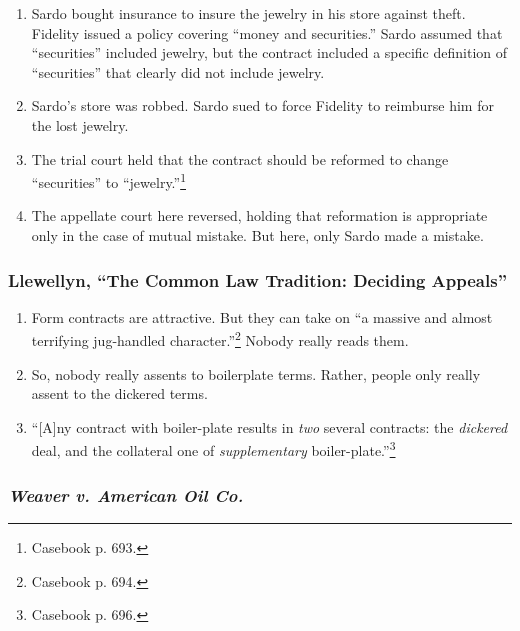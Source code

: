 \begin{enumerate}
    \item Sardo bought insurance to insure the jewelry in his store against 
    theft. Fidelity issued a policy covering ``money and securities.'' Sardo 
    assumed that ``securities'' included jewelry, but the contract included a 
    specific definition of ``securities'' that clearly did not include 
    jewelry.
    \item Sardo's store was robbed. Sardo sued to force Fidelity to reimburse 
    him for the lost jewelry.
    \item The trial court held that the contract should be reformed to change 
    ``securities'' to ``jewelry.''\footnote{Casebook p. 693.}
    \item The appellate court here reversed, holding that reformation is 
    appropriate only in the case of mutual mistake. But here, only Sardo made 
    a mistake. 
\end{enumerate}

\subsubsection{Llewellyn, ``The Common Law Tradition: Deciding Appeals''}

\begin{enumerate}
    \item Form contracts are attractive. But they can take on ``a massive and 
    almost terrifying jug-handled character.''\footnote{Casebook p. 694.} 
    Nobody really reads them.
    \item So, nobody really assents to boilerplate terms. Rather, people only 
    really assent to the dickered terms.
    \item ``[A]ny contract with boiler-plate results in \emph{two} several 
    contracts: the \emph{dickered} deal, and the collateral one of 
    \emph{supplementary} boiler-plate.''\footnote{Casebook p. 696.}
\end{enumerate}

\subsubsection{\emph{Weaver v. American Oil Co.}}


